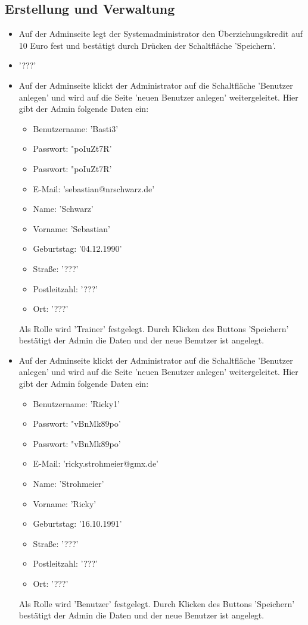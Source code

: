 \documentclass[a4paper]{scrreprt}
\begin{document}
		\subsection{Erstellung und Verwaltung}
			\begin{itemize}
				\item {} 
				Auf der Adminseite legt der Systemadministrator den Überziehungskredit auf 10 Euro fest und bestätigt durch Drücken der Schaltfläche 'Speichern'.
				
				\item {}
				'???'
				
				\item {} 
				Auf der Adminseite klickt der Administrator auf die Schaltfläche 'Benutzer anlegen' und wird auf die Seite 'neuen Benutzer anlegen' weitergeleitet. Hier gibt der Admin folgende Daten ein:
					\begin{itemize}
						\item Benutzername: 'Basti3' 
						\item Passwort: "poIuZt7R'
						\item Passwort: "poIuZt7R'
						\item E-Mail: 'sebastian@nrschwarz.de'
						\item Name: 'Schwarz'
						\item Vorname: 'Sebastian'
						\item Geburtstag: '04.12.1990'
						\item Straße: '???'
						\item Postleitzahl: '???'
						\item Ort: '???'
					\end{itemize}
				Als Rolle wird 'Trainer' festgelegt. Durch Klicken des Buttons 'Speichern' bestätigt der Admin die Daten und der neue Benutzer ist angelegt.	
				
				\item {} 
				Auf der Adminseite klickt der Administrator auf die Schaltfläche 'Benutzer anlegen' und wird auf die Seite 'neuen Benutzer anlegen' weitergeleitet. Hier gibt der Admin folgende Daten ein:
					\begin{itemize}
						\item Benutzername: 'Ricky1' 
						\item Passwort: "vBnMk89po'
						\item Passwort: "vBnMk89po'
						\item E-Mail: 'ricky.strohmeier@gmx.de'
						\item Name: 'Strohmeier'
						\item Vorname: 'Ricky'
						\item Geburtstag: '16.10.1991'
						\item Straße: '???'
						\item Postleitzahl: '???'
						\item Ort: '???'
					\end{itemize}
				Als Rolle wird 'Benutzer' festgelegt. Durch Klicken des Buttons 'Speichern' bestätigt der Admin die Daten und der neue Benutzer ist angelegt.	
				

\end{itemize}
\end{document}
